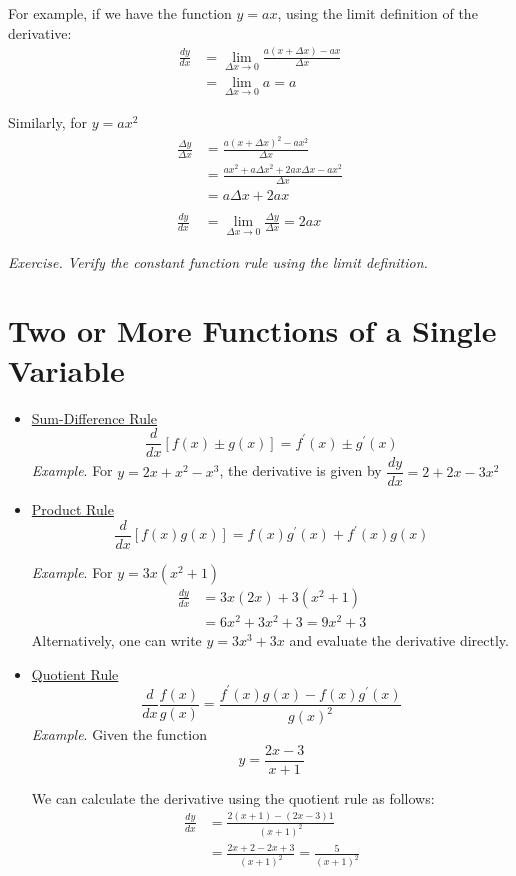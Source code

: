 \documentclass{./../../latex/handout}
\begin{document}
For {example}, if we have the function $y=ax$, using the limit definition of the derivative: 
\[ \begin{aligned} \frac{d y}{d x} &=\lim _{\Delta x \rightarrow 0} \frac{a(x+\Delta x)-a x}{\Delta x} \\ &=\lim _{\Delta x \rightarrow 0} a=a \end{aligned} \]

Similarly, for $y=ax^2$
\[
\begin{aligned}
\frac{\Delta y}{\Delta x} &=\frac{a(x+\Delta x)^{2}-a x^{2}}{\Delta x} \\
&=\frac{a x^{2}+a \Delta x^{2}+2 a x \Delta x-a x^{2}}{\Delta x} \\
&=a \Delta x+2a x \\~\\
\frac{d y}{d x}&=\lim _{\Delta x \rightarrow 0} \frac{\Delta y}{\Delta x} =2 ax
\end{aligned}
\]

\textit{Exercise. Verify the constant function rule using the limit definition.}

\newpage
\section*{Two or More Functions of a Single Variable}
\begin{itemize}
\item \underline{Sum-Difference Rule}
\[ \frac{d}{d x}[f(x) \pm g(x)]=f^{\prime}(x) \pm g^{\prime}(x) \]
\textit{Example}. For $y=2x+x^2- x^{3}$, the derivative is given by $ \dfrac{d y}{d x}=2+2x-3x^2 $ \\

\item \underline{Product Rule}
\[
\frac{d}{d x}[f(x) g(x)]=f(x) g^{\prime}(x)+f^{\prime}(x) g(x)
\] 

\textit{Example}. For  \( y =3 x\left(x^{2}+1\right) \)\\
\[
\begin{aligned}
\frac{dy}{d x} &=3 x(2 x)+3\left(x^{2}+1\right) \\
&=6 x^{2}+3x^2+3 = 9 x^2+3
\end{aligned}
\]
Alternatively, one can write \( y =3x^3+3x \) and evaluate the derivative directly. \\
\item \underline{Quotient Rule}
\[ \frac{d}{d x} \frac{f(x)}{g(x)}=\frac{f^{\prime}(x) g(x)-f(x) g^{\prime}(x)}{g(x)^2} \]
\textit{Example}. Given the function \[
y=\frac{2 x-3}{x+1}
\]

We can calculate the derivative using the quotient rule as follows:
\[
\begin{aligned}
\frac{d y}{d x} &=\frac{2(x+1)-(2 x-3) 1}{(x+1)^{2}} \\
&=\frac{2 x+2-2 x+3}{(x+1)^{2}}=\frac{5}{(x+1)^{2}}
\end{aligned}
\]
\end{itemize}
\end{document}
